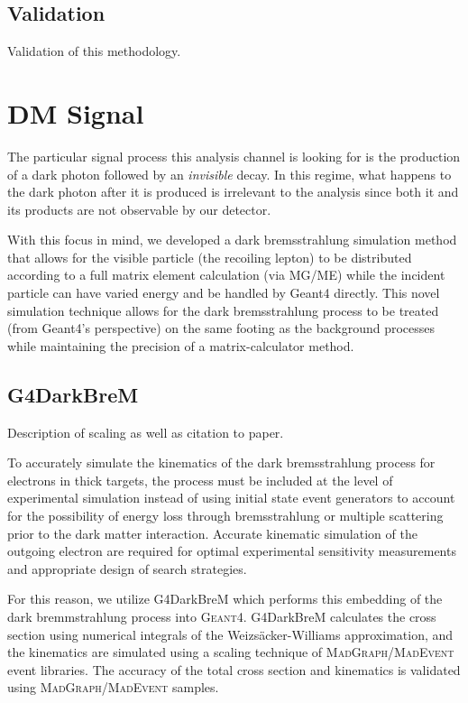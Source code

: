 \subsection{Validation}
\begin{todoenv}Validation of this methodology.\end{todoenv}

\section{DM Signal}
The particular signal process this analysis channel is looking for is the
production of a dark photon followed by an \emph{invisible} decay. In this
regime, what happens to the dark photon after it is produced is irrelevant
to the analysis since both it and its products are not observable by our
detector.

With this focus in mind, we developed a dark bremsstrahlung simulation method
that allows for the visible particle (the recoiling lepton) to be distributed
according to a full matrix element calculation (via MG/ME) while the incident
particle can have varied energy and be handled by Geant4 directly. This novel
simulation technique allows for the dark bremsstrahlung process to be treated
(from Geant4's perspective) on the same footing as the background processes
while maintaining the precision of a matrix-calculator method.

\subsection{G4DarkBreM}
\begin{todoenv}Description of scaling as well as citation to paper.\end{todoenv}
To accurately simulate the kinematics of the dark bremsstrahlung process for electrons in thick targets, the process must be included at the level of experimental simulation instead of using initial state event generators to account for the possibility of energy loss through bremsstrahlung or multiple scattering prior to the dark matter interaction. Accurate kinematic simulation of the outgoing electron are required for optimal experimental sensitivity measurements and appropriate design of search strategies.

For this reason, we utilize G4DarkBreM \cite{g4darkbrem} which performs this embedding of the dark bremmstrahlung process into \textsc{Geant}4. G4DarkBreM calculates the cross section using numerical integrals of the Weizs\"{a}cker-Williams approximation, and the kinematics are simulated using a scaling technique of \textsc{MadGraph/MadEvent} event libraries. The accuracy of the total cross section and kinematics is validated using \textsc{MadGraph/MadEvent} samples.


